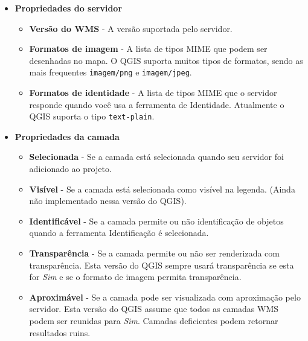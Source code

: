 \begin{itemize}
\item \textbf{Propriedades do servidor}

\begin{itemize}
\item \textbf{Versão do WMS} - A versão suportada pelo servidor.

\item \textbf{Formatos de imagem} - A lista de tipos MIME que podem ser desenhadas no mapa. O QGIS suporta muitos tipos de formatos, sendo as mais frequentes \texttt{imagem/png} 
                                  e \texttt{imagem/jpeg}.

\item \textbf{Formatos de identidade} - A lista de tipos MIME que o servidor responde quando você usa a ferramenta de Identidade. Atualmente o QGIS suporta o tipo \texttt{text-plain}.

\end{itemize}

\item \textbf{Propriedades da camada}

\begin{itemize}
\item \textbf{Selecionada} - Se a camada está selecionada quando seu servidor foi adicionado ao projeto.

\item \textbf{Visível} - Se a camada está selecionada como visível na legenda. (Ainda não implementado nessa versão do QGIS).

\item \textbf{Identificável} - Se a camada permite ou não identificação de objetos quando a ferramenta Identificação é selecionada.

\item \textbf{Transparência} - Se a camada permite ou não ser renderizada com transparência. Esta versão do QGIS sempre usará transparência se esta for \textsl{Sim} e se o formato de imagem permita transparência.


\item \textbf{Aproximável} - Se a camada pode ser visualizada com aproximação pelo servidor. Esta versão do QGIS assume que todos as camadas WMS podem ser reunidas para \textsl{Sim}. Camadas deficientes podem retornar resultados ruins.


\end{itemize}
\end{itemize}
